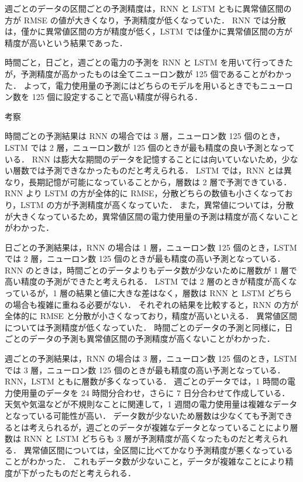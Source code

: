\documentclass[twocolumn,fleqn,10pt]{jarticle}
\makeatletter
\renewcommand{\section}{\@startsection
{section}{3}{0mm}{5mm}{5mm}{\bfseries \normalsize}}
\makeatother
\begin{document}
週ごとのデータの区間ごとの予測精度は，RNN と LSTM ともに異常値区間の方が RMSE の値が大きくなり，予測精度が低くなっていた．
RNN では分散は，僅かに異常値区間の方が精度が低く，LSTM では僅かに異常値区間の方が精度が高いという結果であった．





時間ごと，日ごと，週ごとの電力の予測を RNN と LSTM を用いて行ってきたが，予測精度が高かったものは全てニューロン数が 125 個であることがわかった．
よって，電力使用量の予測にはどちらのモデルを用いるときでもニューロン数を 125 個に設定することで高い精度が得られる．







\section{考察}


時間ごとの予測結果は RNN の場合では 3 層，ニューロン数 125 個のとき，LSTM では 2 層，ニューロン数が 125 個のときが最も精度の良い予測となっている．
RNN は膨大な期間のデータを記憶することには向いていないため，少ない層数では予測できなかったものだと考えられる．
LSTM では，RNN とは異なり，長期記憶が可能になっていることから，層数は 2 層で予測できている．
RNN より LSTM の方が全体的に RMSE，分散どちらの数値も小さくなっており，LSTM の方が予測精度が高くなっていた．
また，異常値については，分散が大きくなっているため，異常値区間の電力使用量の予測は精度が高くないことがわかった．





日ごとの予測結果は，RNN の場合は 1 層，ニューロン数 125 個のとき，LSTM では 2 層，ニューロン数 125 個のときが最も精度の高い予測となっている．
RNN のときは，時間ごとのデータよりもデータ数が少ないために層数が 1 層で高い精度の予測ができたと考えられる．
LSTM では 2 層のときが精度が高くなっているが，1 層の結果と値に大きな差はなく，層数は RNN と LSTM どちらの場合も複雑に重ねる必要がない．
それぞれの結果を比較すると，RNN の方が全体的に RMSE と分散が小さくなっており，精度が高いといえる．
異常値区間については予測精度が低くなっていた．
時間ごとのデータの予測と同様に，日ごとのデータの予測も異常値区間の予測精度が高くないことがわかった．





週ごとの予測結果は，RNN の場合は 3 層，ニューロン数 125 個のとき，LSTM では 3 層，ニューロン数 125 個のときが最も精度の高い予測となっている．
RNN，LSTM ともに層数が多くなっている．
週ごとのデータでは，1 時間の電力使用量のデータを 24 時間分合わせ，さらに 7 日分合わせて作成している．
天気や気温などが不規則なことに関連して，1 週間の電力使用量は複雑なデータとなっている可能性が高い．
データ数が少ないため層数は少なくても予測できるとは考えられるが，週ごとのデータが複雑なデータとなっていることにより層数は RNN と LSTM どちらも 3 層が予測精度が高くなったものだと考えられる．
異常値区間については，全区間に比べてかなり予測精度が悪くなっていることがわかった．
これもデータ数が少ないこと，データが複雑なことにより精度が下がったものだと考えられる．
\end{document}
